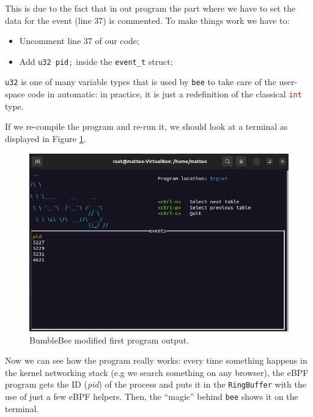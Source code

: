 This is due to the fact that in out program the part where we have to set the data for the event (line 37) is commented.
To make things work we have to:

\begin{itemize}
	\item 
		Uncomment line 37 of our code;
	\item 
		Add \colorbox{backcolour}{\lstinline[style=cstyle, language=C]|u32 pid;|} inside the \colorbox{backcolour}{\lstinline[style=cstyle, language=C]|event_t|} struct;
\end{itemize}

\colorbox{backcolour}{\lstinline[style=cstyle, language=C]|u32|} is one of many variable types that is used by \colorbox{backcolour}{\lstinline[style=highlight, language=bash]|bee|} to take care of the user-space code in automatic: in practice, it is just a redefinition of the classical \colorbox{backcolour}{\lstinline[style=cstyle, language=C]|int|} type.

If we re-compile the program and re-run it, we should look at a terminal as displayed in Figure \ref{fig:bee_modified_first_program_output}.

\begin{figure}[h]
	\centering
	\includegraphics[width=0.7\linewidth]{images/LinuxDevelopment/n_rb_p_working_display.png}
	\caption{BumbleBee modified first program output.}
	\label{fig:bee_modified_first_program_output}
\end{figure}

Now we can see how the program really works: every time something happens in the kernel networking stack (e.g we search something on any browser), the eBPF program gets the ID (\textit{pid}) of the process and puts it in the \colorbox{backcolour}{\lstinline[style=highlight, language=bash]|RingBuffer|} with the use of just a few eBPF helpers.
Then, the ``magic'' behind \colorbox{backcolour}{\lstinline[style=highlight, language=bash]|bee|} shows it on the terminal.


